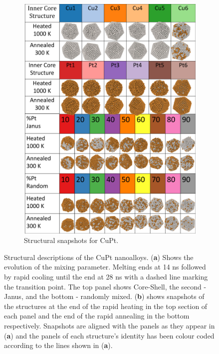\begin{figure}
\begin{subfigure}{0.39\textwidth}
    \label{fig:CuPtMix}
\end{subfigure}
\begin{subfigure}{0.56\textwidth}
    \includegraphics[width=\linewidth]{figures/MD/Alloys/CuPt_Struts.pdf}
    \caption{Structural snapshots for CuPt.}
    \label{fig:CuPt_Struts}
\end{subfigure}
    \caption{Structural descriptions of the CuPt nanoalloys. (\textbf{a}) Shows the evolution of the mixing parameter. Melting ends at 14 ns followed by rapid cooling until the end at 28 ns with a dashed line marking the transition point. The top panel shows Core-Shell, the second - Janus, and the bottom - randomly mixed. (\textbf{b}) shows snapshots of the structures at the end of the rapid heating in the top section of each panel and the end of the rapid annealing in the bottom respectively. Snapshots are aligned with the panels as they appear in (\textbf{a}) and the panels of each structure's identity has been colour coded according to the lines shown in (\textbf{a}).}
    \label{fig:CuPt_NA}
\end{figure}

